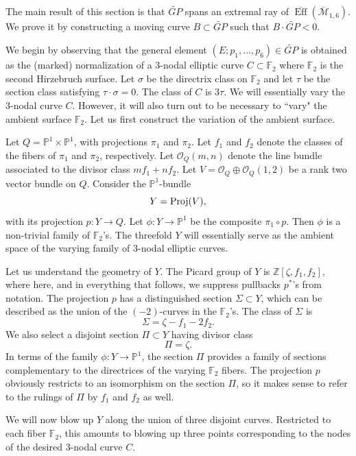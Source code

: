 \documentclass[11]{amsart}
\theoremstyle{plain}
\theoremstyle{definition}
\newcommand{\BM}{\overline{\mathcal M}}
\newcommand{\OO}{\mathcal O}
\newcommand{\BEff}{\overline{\operatorname{Eff}}}
\newcommand{\wt}{\widetilde}
\newcommand{\bbF}{\mathbb F}
\newcommand{\bbP}{\mathbb P}
\newcommand{\bbZ}{\mathbb Z}
\begin{document}
The main result of this section is that $\wt{GP}$ spans an extremal ray of $\BEff(\BM_{1,6})$. 
We prove it by constructing a moving curve $B \subset \wt{GP}$ such that $B \cdot \wt{GP} < 0$.  

We begin by observing that the general element $(E; p_{1}, ... ,p_{6}) \in \wt{GP}$ is obtained as the (marked) normalization of a $3$-nodal elliptic curve $C \subset \bbF_{2}$ where $\bbF_{2}$ is the second Hirzebruch surface.  Let $\sigma$ be the directrix class on $\bbF_{2}$ and let $\tau$ be the section class satisfying $\tau \cdot \sigma = 0$. The class of $C$ is $3\tau$.  We will essentially vary the $3$-nodal curve $C$.  However, it will also turn out to be necessary to ``vary" the ambient surface $\bbF_{2}$.  Let us first construct the variation of the ambient surface. 

Let $Q = \bbP^1 \times \bbP^1$, with projections $\pi_{1}$ and $\pi_{2}$.  Let $f_{1}$ and $f_{2}$ denote the classes 
of the fibers of $\pi_{1}$ and $\pi_{2}$, respectively. Let $\OO_{Q}(m,n)$ denote the line bundle associated to the divisor class $mf_{1} + nf_{2}$. Let 
$V =\OO_{Q} \oplus \OO_{Q}(1,2)$
be a rank two vector bundle on $Q$. Consider the $\bbP^1$-bundle 
\[Y = {\rm Proj}(V),\] 
with its projection $p : Y \to Q.$ Let $\phi: Y \to \bbP^1$ be the composite $\pi_{1} \circ p$. Then $\phi$ is a non-trivial family of $\bbF_{2}$'s.  The threefold $Y$ will essentially serve as the ambient space of the varying family of $3$-nodal elliptic curves. 

Let us understand the geometry of $Y$. The Picard group of $Y$ is $\bbZ[\zeta,f_{1},f_{2}]$, where here, and in everything that follows, we suppress pullbacks $p^{*}$'s from notation. The projection $p$ has a distinguished section  $\Sigma \subset Y$, which can be described as the union of the $(-2)$-curves in the $\bbF_{2}$'s.  The class of $\Sigma$ is 
\[\Sigma = \zeta - f_{1} - 2f_{2}.\] 
We also select a disjoint section $\Pi \subset Y$ having divisor class 
\[\Pi = \zeta.\]  
In terms of the family $\phi : Y \to \bbP^1$, the section $\Pi$ provides a family of sections complementary to the directrices of the varying $\bbF_{2}$ fibers. The projection $p$ obviously restricts to an isomorphism on the section $\Pi$, so it makes sense to refer to the rulings of $\Pi$ by $f_{1}$ and $f_{2}$ as well. 



We will now blow up $Y$ along the union of three disjoint curves. Restricted to each fiber $\bbF_2$, this amounts to blowing up three points corresponding to the nodes of the desired $3$-nodal curve $C$.  
\end{document}
